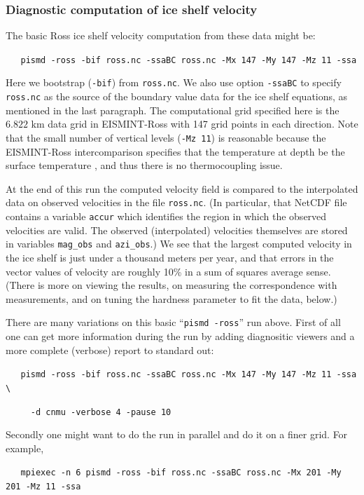 \documentclass[11pt,final]{amsart}
\begin{document}
\subsubsection*{Diagnostic computation of ice shelf velocity}  The basic Ross ice shelf velocity computation from these data might be:

\verb|   pismd -ross -bif ross.nc -ssaBC ross.nc -Mx 147 -My 147 -Mz 11 -ssa|

\noindent Here we bootstrap (\verb|-bif|) from \verb|ross.nc|.  We also use option \verb|-ssaBC| to specify \verb|ross.nc| as the source of the boundary value data for the ice shelf equations, as mentioned in the last paragraph.  The computational grid specified here is the $6.822$ km data grid in EISMINT-Ross with 147 grid points in each direction.  Note that the small number of vertical levels (\verb|-Mz 11|) is reasonable because the EISMINT-Ross intercomparison specifies that the temperature at depth be the surface temperature \cite{MacAyealetal}, and thus there is no thermocoupling issue.

At the end of this run the computed velocity field is compared to the interpolated data on observed velocities in the file \verb|ross.nc|.  (In particular, that NetCDF file contains a variable \verb|accur| which identifies the region in which the observed velocities are valid.  The observed (interpolated) velocities themselves are stored in variables \verb|mag_obs| and \verb|azi_obs|.)  We see that the largest computed velocity in the ice shelf is just under a thousand meters per year, and that errors in the vector values of velocity are roughly 10\% in a sum of squares average sense.  (There is more on viewing the results, on measuring the correspondence with measurements, and on tuning the hardness parameter to fit the data, below.)

There are many variations on this basic ``\verb|pismd -ross|'' run above.  First of all one can get more information during the run by adding diagnositic viewers and a more complete (verbose) report to standard out:

\verb|   pismd -ross -bif ross.nc -ssaBC ross.nc -Mx 147 -My 147 -Mz 11 -ssa \|

\verb|     -d cnmu -verbose 4 -pause 10|

\noindent Secondly one might want to do the run in parallel and do it on a finer grid.  For example,

\small
\verb|   mpiexec -n 6 pismd -ross -bif ross.nc -ssaBC ross.nc -Mx 201 -My 201 -Mz 11 -ssa|
\normalsize
\end{document}
